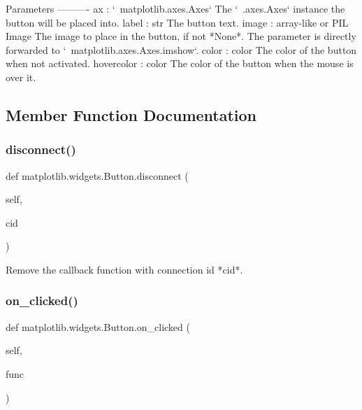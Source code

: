 \begin{DoxyVerb}Parameters
----------
ax : `~matplotlib.axes.Axes`
    The `~.axes.Axes` instance the button will be placed into.
label : str
    The button text.
image : array-like or PIL Image
    The image to place in the button, if not *None*.  The parameter is
    directly forwarded to `~matplotlib.axes.Axes.imshow`.
color : color
    The color of the button when not activated.
hovercolor : color
    The color of the button when the mouse is over it.
\end{DoxyVerb}
 

\subsection{Member Function Documentation}
\mbox{\label{classmatplotlib_1_1widgets_1_1Button_a65abc7ad50b24913e1da7f1a670dd4e8}} 
\subsubsection{\texorpdfstring{disconnect()}{disconnect()}}
{\footnotesize\ttfamily def matplotlib.\+widgets.\+Button.\+disconnect (\begin{DoxyParamCaption}\item[{}]{self,  }\item[{}]{cid }\end{DoxyParamCaption})}

\begin{DoxyVerb}Remove the callback function with connection id *cid*.\end{DoxyVerb}
 \mbox{\label{classmatplotlib_1_1widgets_1_1Button_a061596d93476b79244626f8a79d52a81}} 
\subsubsection{\texorpdfstring{on\+\_\+clicked()}{on\_clicked()}}
{\footnotesize\ttfamily def matplotlib.\+widgets.\+Button.\+on\+\_\+clicked (\begin{DoxyParamCaption}\item[{}]{self,  }\item[{}]{func }\end{DoxyParamCaption})}

